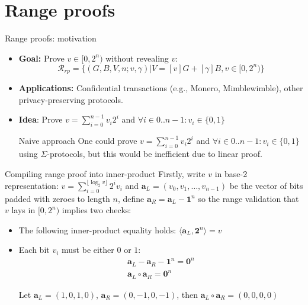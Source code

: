\documentclass{zkdl-presentation-template}
\begin{document}
\section{Range proofs}

\begin{frame}{Range proofs: motivation}
    \begin{itemize}
        \item \textbf{Goal:} Prove $v \in [0, 2^n)$ without revealing $v$:
        $$\mathcal{R}_{rp} = \{ (G, B, V, n; v, \gamma) \vert V = [v]G + [\gamma]B, v \in [0, 2^n) \}$$
        \item \textbf{Applications:} Confidential transactions (e.g., Monero, Mimblewimble), other privacy-preserving protocols.
        \item \textbf{Idea}: Prove $v = \sum_{i=0}^{n-1} v_i 2^i$ and $\forall i \in 0..n-1: v_i \in \{0,1\}$
        \begin{block}{Naive approach}
            One could prove $v = \sum_{i=0}^{n-1} v_i 2^i$ and $\forall i \in 0..n-1: v_i \in \{0,1\}$ using $\Sigma$-protocols, but this would be inefficient due to linear proof.
        \end{block}
    \end{itemize}
\end{frame}

\begin{frame}{Compiling range proof into inner-product}
    Firstly, write $v$ in base-2 representation: $v = \sum_{i=0}^{\lfloor \log_2 v \rfloor} 2^i v_i$ and $\mathbf{a}_L = (v_0, v_1, \dots, v_{n-1})$ be the vector of bits padded with zeroes to length $n$, define $\mathbf{a}_R = \mathbf{a}_L - \mathbf{1}^n$ so the range validation that $v$ lays in $[0, 2^n)$ implies two checks:
    \begin{itemize}
        \item The following inner-product equality holds: $\langle \mathbf{a}_L, \mathbf{2}^n \rangle = v$
        \item Each bit $v_i$ must be either $0$ or $1$:
        \begin{align*}
        \mathbf{a}_L - \mathbf{a}_R - \mathbf{1}^n = \mathbf{0}^n \\
        \mathbf{a}_L \circ \mathbf{a}_R = \mathbf{0}^n
        \end{align*}
        \begin{example}
            Let $\mathbf{a}_L = (1, 0, 1, 0)$, $\mathbf{a}_R = (0, -1, 0, -1)$, then 
            $\mathbf{a}_L \circ \mathbf{a}_R = (0, 0, 0, 0)$
        \end{example}
    \end{itemize}
\end{frame}
\end{document}
